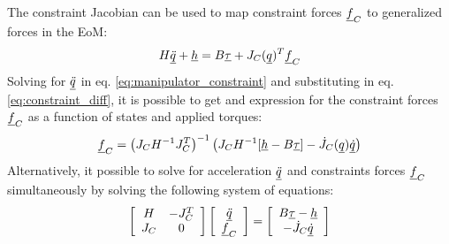 {The constraint Jacobian can be used to map constraint forces $\underline{f}_C$ to generalized forces in the EoM:
%
\begin{align}
H \underline{\ddot{q}} + \underline{h} = B \underline{\tau} + J_C( \underline{ q } )^T  \underline{f}_C
\label{eq:manipulator_constraint}
\end{align}
%
Solving for $\underline{\ddot{q}}$ in eq. \eqref{eq:manipulator_constraint} and substituting in eq. \eqref{eq:constraint_diff}, it is possible to get and expression for the constraint forces $\underline{f}_C$ as a function of states and applied torques:
%
\begin{align}
\underline{f}_C = \left( J_C H^{-1} J_C^T \right)^{-1} \left(  J_C H^{-1} [\underline{h} - B \underline{\tau} ] - \dot{J}_C( \underline{ q } ) \underline{\dot{q}}   \right)
\label{eq:const_forces}
\end{align}
%
Alternatively, it possible to solve for acceleration $\underline{\ddot{q}}$ and constraints forces $\underline{f}_C$ simultaneously by solving the following system of equations:
%
\begin{align}
\left[ \begin{array}{c c } 	H & -J_C^T  \\ J_C 	& 0  	\end{array} \right] \left[ \begin{array}{c} \underline{\ddot{q}}  \\ \underline{f}_C \end{array} \right] = \left[ \begin{array}{c}  B \underline{\tau} - \underline{h}   \\ -\dot{J}_C \underline{\dot{q}}  \end{array} \right]
\label{eq:manipulator_constraint_eom}
\end{align}


}
